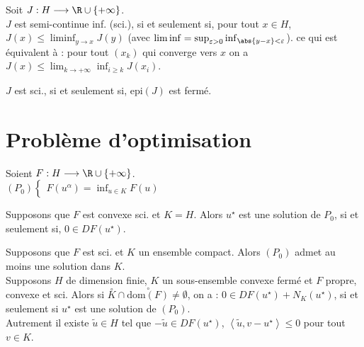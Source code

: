 \documentclass[12pt,a4paper]{article}
\begin{document}
	\begin{defi}
		\begin{minipage}[t]{15cm}
			Soit $J : H \longrightarrow \R\cup\{+\infty\}$.\\
			$J$ est semi-continue inf. (sci.), si et seulement si, pour tout $x \in H$,\\ $J(x) \leq \liminf_{y \to x} J(y)$ (avec $\liminf = \sup_{\varepsilon>0}\inf_{\abs{y-x} < \varepsilon} $). ce qui est équivalent à : pour tout $(x_k)$ qui converge vers $x$ on a $J(x) \leq \lim_{k \to + \infty}\inf_{i \geq k} J(x_i)$.
		\end{minipage}
	\end{defi}
	
	\begin{prop}
		\begin{minipage}[t]{15cm}
			$J$ est sci., si et seulement si, $\mathrm{epi}(J)$ est fermé.
		\end{minipage}
	\end{prop}
	
	\section{Problème d'optimisation}
	
	Soient $F: H \longrightarrow\R\cup\{+\infty\}$.\\
	
	$(P_0) \begin{cases}
		F(u^\alpha) = \inf_{u \in K}F(u)
	\end{cases}$
	
	\begin{thm}
		\begin{minipage}[t]{15.5cm}
			Supposons que $F$ est convexe sci. et $K=H$. Alors $u^\star$ est une solution de $P_0$, si et seulement si, $0 \in DF(u^\star)$.
		\end{minipage}
	\end{thm}
	
	\begin{thm}
		\begin{minipage}[t]{15.5cm}
			Supposons que $F$ est sci. et $K$ un ensemble compact. Alors $(P_0)$ admet au moins une solution dans $K$.\\
			Supposons $H$ de dimension finie, $K$ un sous-ensemble convexe fermé et $F$ propre, convexe et sci. Alors si $\overset{\circ}{K}\cap\overset{\circ}{\mathrm{dom}(F)} \not=\emptyset$, on a : $0 \in DF(u^\star)+N_K(u^\star)$, si et seulement si $u^\star$ est une solution de $(P_0)$.\\
			Autrement il existe $\tilde{u} \in H$ tel que $-\tilde u \in DF(u^\star)$, $\left<\tilde u, v-u^\star\right> \leq 0$ pour tout $v \in K$.
		\end{minipage}
	\end{thm}
	
\end{document}

